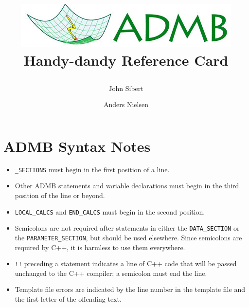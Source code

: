 %
%
\usepackage{graphics}
\usepackage{fancyhdr}
\usepackage{color}
\pagestyle{fancy}
\lhead{}
\chead{}
\rhead{}
\lfoot{{\tiny\today}}
\cfoot{} %
\renewcommand{\headrulewidth}{0pt}
\renewcommand{\footrulewidth}{0pt}
\usepackage[bookmarks=false]{hyperref}


\title{\begin{minipage}[t]{0.98\textwidth}\begin{center}
\includegraphics[width=\textwidth]{./cropped-logo-20080527.jpeg}
{\color{admbgreen}Handy-dandy Reference Card}\\
    \end{center}\end{minipage}}

\author{John Sibert \and Anders Nielsen}


\setmargins{3ex}{5ex}{1.5em}{1.5em}


\maketitle
\thispagestyle{empty}
\scriptsize
\small
\parindent=0pt

\section{ADMB Syntax Notes}
\begin{itemize}
\item \verb+_SECTIONS+ must begin in the first position of a line.
\item Other ADMB statements and variable declarations
 must begin in the third position  of the line or beyond.
\item \verb+LOCAL_CALCS+ and \verb+END_CALCS+ 
must begin in the second position.
\item Semicolons are not
required after statements in either the \verb+DATA_SECTION+ or the
\verb+PARAMETER_SECTION+, but should be used elsewhere. Since
semicolons are required by C++, it is harmless to use them
everywhere.
\item \verb+!!+ preceding a statement indicates a line of C++ code
that will be passed unchanged to the C++ compiler; a semicolon must
end the line.
\item Template file errors are indicated by the line number in the template
file and the first letter of the offending text.
\end{itemize}


